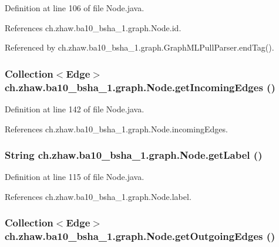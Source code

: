 Definition at line 106 of file Node.java.

References ch.zhaw.ba10\_\-bsha\_\-1.graph.Node.id.

Referenced by ch.zhaw.ba10\_\-bsha\_\-1.graph.GraphMLPullParser.endTag().\hypertarget{classch_1_1zhaw_1_1ba10__bsha__1_1_1graph_1_1Node_a315d8069f8d2d0b8d50bbc2b5e57144b}{
\subsubsection[{getIncomingEdges}]{\setlength{\rightskip}{0pt plus 5cm}Collection$<${\bf Edge}$>$ ch.zhaw.ba10\_\-bsha\_\-1.graph.Node.getIncomingEdges ()}}
\label{classch_1_1zhaw_1_1ba10__bsha__1_1_1graph_1_1Node_a315d8069f8d2d0b8d50bbc2b5e57144b}


Definition at line 142 of file Node.java.

References ch.zhaw.ba10\_\-bsha\_\-1.graph.Node.incomingEdges.\hypertarget{classch_1_1zhaw_1_1ba10__bsha__1_1_1graph_1_1Node_a0175cf0a68d3cb8e43579638f4ccc264}{
\subsubsection[{getLabel}]{\setlength{\rightskip}{0pt plus 5cm}String ch.zhaw.ba10\_\-bsha\_\-1.graph.Node.getLabel ()}}
\label{classch_1_1zhaw_1_1ba10__bsha__1_1_1graph_1_1Node_a0175cf0a68d3cb8e43579638f4ccc264}


Definition at line 115 of file Node.java.

References ch.zhaw.ba10\_\-bsha\_\-1.graph.Node.label.\hypertarget{classch_1_1zhaw_1_1ba10__bsha__1_1_1graph_1_1Node_a6261a952f89dfff7e010c3ddc4a730d8}{
\subsubsection[{getOutgoingEdges}]{\setlength{\rightskip}{0pt plus 5cm}Collection$<${\bf Edge}$>$ ch.zhaw.ba10\_\-bsha\_\-1.graph.Node.getOutgoingEdges ()}}
\label{classch_1_1zhaw_1_1ba10__bsha__1_1_1graph_1_1Node_a6261a952f89dfff7e010c3ddc4a730d8}


